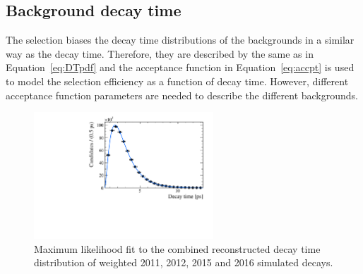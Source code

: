 \subsection{Background decay time \pdfs}
\label{sec:bkgDTpdf}



The selection biases the decay time distributions of the backgrounds in a similar way as the \bsmumu decay time. Therefore, they are described by the same \pdf as in Equation~\ref{eq:DTpdf} and the acceptance function in Equation~\ref{eq:accpt} is used to model the selection efficiency as a function of decay time. However, different acceptance function parameters are needed to describe the different backgrounds.


\begin{figure}[tbp]
    \centering
        \includegraphics[width= 0.6\textwidth]{./Figs/LifetimeMeasurement/Bs2MuMu_Acceptance_fit.pdf}
    \caption{Maximum likelihood fit to the combined reconstructed decay time distribution of weighted 2011, 2012, 2015 and 2016 simulated \bsmumu decays. }
    \label{fig:accptfit}
\end{figure}


